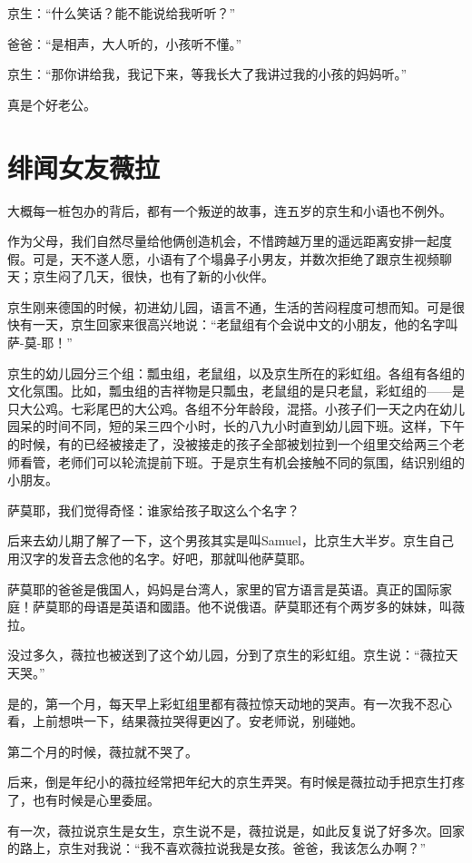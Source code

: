 \documentclass[twoside,openright,headings=optiontohead]{ctexbook} %
\begin{document}
{京生：``什么笑话？能不能说给我听听？''

爸爸：``是相声，大人听的，小孩听不懂。''

京生：``那你讲给我，我记下来，等我长大了我讲过我的小孩的妈妈听。''

真是个好老公。

\chapter*{绯闻女友薇拉}\label{vera}

大概每一桩包办的背后，都有一个叛逆的故事，连五岁的京生和小语也不例外。

作为父母，我们自然尽量给他俩创造机会，不惜跨越万里的遥远距离安排一起度假。可是，天不遂人愿，小语有了个塌鼻子小男友，并数次拒绝了跟京生视频聊天；京生闷了几天，很快，也有了新的小伙伴。

京生刚来德国的时候，初进幼儿园，语言不通，生活的苦闷程度可想而知。可是很快有一天，京生回家来很高兴地说：``老鼠组有个会说中文的小朋友，他的名字叫萨-莫-耶！''

京生的幼儿园分三个组：瓢虫组，老鼠组，以及京生所在的彩虹组。各组有各组的文化氛围。比如，瓢虫组的吉祥物是只瓢虫，老鼠组的是只老鼠，彩虹组的------是只大公鸡。七彩尾巴的大公鸡。各组不分年龄段，混搭。小孩子们一天之内在幼儿园呆的时间不同，短的呆三四个小时，长的八九小时直到幼儿园下班。这样，下午的时候，有的已经被接走了，没被接走的孩子全部被划拉到一个组里交给两三个老师看管，老师们可以轮流提前下班。于是京生有机会接触不同的氛围，结识别组的小朋友。

萨莫耶，我们觉得奇怪：谁家给孩子取这么个名字？

后来去幼儿期了解了一下，这个男孩其实是叫Samuel，比京生大半岁。京生自己用汉字的发音去念他的名字。好吧，那就叫他萨莫耶。

萨莫耶的爸爸是俄国人，妈妈是台湾人，家里的官方语言是英语。真正的国际家庭！萨莫耶的母语是英语和國語。他不说俄语。萨莫耶还有个两岁多的妹妹，叫薇拉。

没过多久，薇拉也被送到了这个幼儿园，分到了京生的彩虹组。京生说：``薇拉天天哭。''

是的，第一个月，每天早上彩虹组里都有薇拉惊天动地的哭声。有一次我不忍心看，上前想哄一下，结果薇拉哭得更凶了。安老师说，别碰她。

第二个月的时候，薇拉就不哭了。

后来，倒是年纪小的薇拉经常把年纪大的京生弄哭。有时候是薇拉动手把京生打疼了，也有时候是心里委屈。

有一次，薇拉说京生是女生，京生说不是，薇拉说是，如此反复说了好多次。回家的路上，京生对我说：``我不喜欢薇拉说我是女孩。爸爸，我该怎么办啊？''

}
\end{document}
